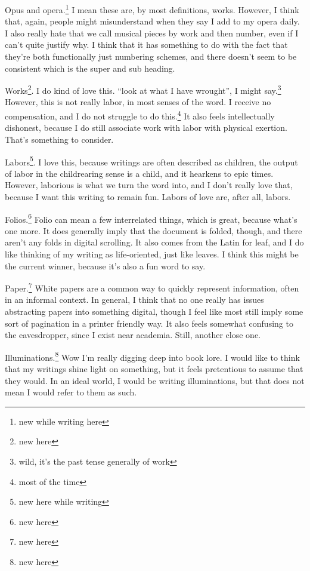\documentclass[12pt]{article}
\newcommand{\say}[1]{``#1''}
\renewcommand{\,}{\textsuperscript{,}}
\begin{document}
Opus and opera.\footnote{new while writing here}  
I mean these are, by most definitions, works.  
However, I think that, again, people might misunderstand when they say I add to my opera daily.  
I also really hate that we call musical pieces by work and then number, even if I can't quite justify why.  
I think that it has something to do with the fact that they're both functionally just numbering schemes, and there doesn't seem to be consistent which is the super and sub heading.

Works\footnote{new here}.  
I do kind of love this.  
\say{look at what I have wrought}, I might say.\footnote{wild, it's the past tense generally of work}  
However, this is not really labor, in most senses of the word.  
I receive no compensation, and I do not struggle to do this.\footnote{most of the time}  
It also feels intellectually dishonest, because I do still associate work with labor with physical exertion.  
That's something to consider.

Labors\footnote{new here while writing}.  
I love this, because writings are often described as children, the output of labor in the childrearing sense is a child, and it hearkens to epic times.  
However, laborious is what we turn the word into, and I don't really love that, because I want this writing to remain fun.  
Labors of love are, after all, labors.

Folios.\footnote{new here}  
Folio can mean a few interrelated things, which is great, because what's one more.  
It does generally imply that the document is folded, though, and there aren't any folds in digital scrolling.  
It also comes from the Latin for leaf, and I do like thinking of my writing as life-oriented, just like leaves.  
I think this might be the current winner, because it's also a fun word to say.

Paper.\footnote{new here}  
White papers are a common way to quickly represent information, often in an informal context.  
In general, I think that no one really has issues abstracting papers into something digital, though I feel like most still imply some sort of pagination in a printer friendly way.  
It also feels somewhat confusing to the eavesdropper, since I exist near academia.  
Still, another close one.

Illuminations.\footnote{new here}  
Wow I'm really digging deep into book lore.  
I would like to think that my writings shine light on something, but it feels pretentious to assume that they would.  
In an ideal world, I would be writing illuminations, but that does not mean I would refer to them as such.
\end{document}
